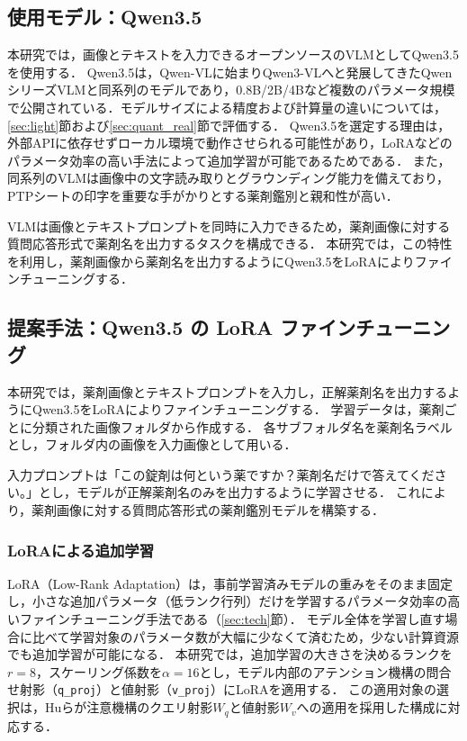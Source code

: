 \documentclass[dvipdfmx]{jsarticle}
\begin{document}
\subsection{使用モデル：Qwen3.5}\label{sec:qwen35}

本研究では，画像とテキストを入力できるオープンソースのVLMとしてQwen3.5を使用する．
Qwen3.5は，Qwen-VL\cite{bai2023qwenvl}に始まりQwen3-VL\cite{qwen3vl2025}へと発展してきたQwenシリーズVLMと同系列のモデルであり，0.8B/2B/4Bなど複数のパラメータ規模で公開されている．モデルサイズによる精度および計算量の違いについては，\ref{sec:light}節および\ref{sec:quant_real}節で評価する．
Qwen3.5を選定する理由は，外部APIに依存せずローカル環境で動作させられる可能性があり，LoRAなどのパラメータ効率の高い手法によって追加学習が可能であるためである．
また，同系列のVLMは画像中の文字読み取りとグラウンディング能力を備えており\cite{bai2023qwenvl}\cite{qwen3vl2025}，PTPシートの印字を重要な手がかりとする薬剤鑑別と親和性が高い．

VLMは画像とテキストプロンプトを同時に入力できるため，薬剤画像に対する質問応答形式で薬剤名を出力するタスクを構成できる．
本研究では，この特性を利用し，薬剤画像から薬剤名を出力するようにQwen3.5をLoRAによりファインチューニングする．

\subsection{提案手法：Qwen3.5 の LoRA ファインチューニング}\label{sec:proposed}

本研究では，薬剤画像とテキストプロンプトを入力し，正解薬剤名を出力するようにQwen3.5をLoRAによりファインチューニングする．
学習データは，薬剤ごとに分類された画像フォルダから作成する．
各サブフォルダ名を薬剤名ラベルとし，フォルダ内の画像を入力画像として用いる．

入力プロンプトは「この錠剤は何という薬ですか？薬剤名だけで答えてください。」とし，モデルが正解薬剤名のみを出力するように学習させる．
これにより，薬剤画像に対する質問応答形式の薬剤鑑別モデルを構築する．

\subsubsection{LoRAによる追加学習}

LoRA（Low-Rank Adaptation）\cite{hu2022lora}は，事前学習済みモデルの重みをそのまま固定し，小さな追加パラメータ（低ランク行列）だけを学習するパラメータ効率の高いファインチューニング手法である（\ref{sec:tech}節）．
モデル全体を学習し直す場合に比べて学習対象のパラメータ数が大幅に少なくて済むため，少ない計算資源でも追加学習が可能になる．
本研究では，追加学習の大きさを決めるランクを$r=8$，スケーリング係数を$\alpha=16$とし，モデル内部のアテンション機構の問合せ射影（\texttt{q\_proj}）と値射影（\texttt{v\_proj}）にLoRAを適用する．
この適用対象の選択は，Huら\cite{hu2022lora}が注意機構のクエリ射影$W_q$と値射影$W_v$への適用を採用した構成に対応する．
\end{document}
